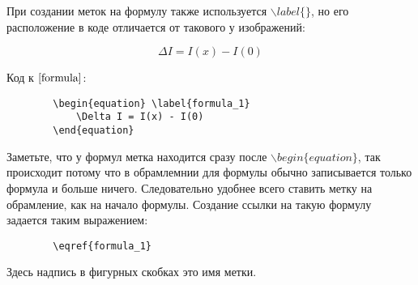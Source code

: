     При создании меток на формулу также используется $\backslash label\{\}$, но его расположение в коде отличается от такового у изображений:
    
    \begin{equation} \label{formula}
        \Delta I = I(x) - I(0)
    \end{equation}
    
    Код к $\eqref{formula}$:
    
    
    \begin{verbatim}
        \begin{equation} \label{formula_1}
            \Delta I = I(x) - I(0)
        \end{equation}
    \end{verbatim}
    
    Заметьте, что у формул метка находится сразу после $\backslash begin\{equation\}$, так происходит потому что в обрамлемнии для формулы обычно записывается только формула и больше ничего. Следовательно удобнее всего ставить метку на обрамление, как на начало формулы. Создание ссылки на такую формулу задается таким выражением:
    
    \begin{verbatim}
        \eqref{formula_1}
    \end{verbatim}
    
    Здесь надпись в фигурных скобках это имя метки.
    
